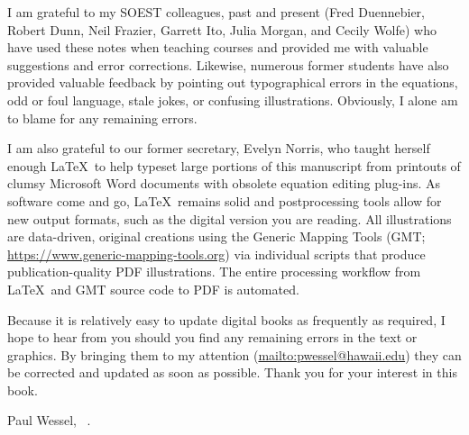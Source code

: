 I am grateful to my SOEST colleagues, past and present (Fred Duennebier, Robert Dunn, Neil Frazier,
Garrett Ito, Julia Morgan, and Cecily Wolfe) who have used these notes when teaching
courses and provided me with valuable suggestions and error corrections.  Likewise, numerous former students have
also provided valuable feedback by pointing out typographical errors in the equations, odd or foul language,
stale jokes, or confusing illustrations.  Obviously, I alone am to blame for any remaining errors.

I am also grateful to our former secretary, Evelyn Norris,
who taught herself enough \LaTeX\ to help typeset large portions of this manuscript from printouts of clumsy Microsoft Word documents
with obsolete equation editing plug-ins.  As software come and go, \LaTeX\ remains solid and postprocessing tools allow
for new output formats, such as the digital version you are reading.  All illustrations are data-driven, original creations using the
Generic Mapping Tools (GMT; \url{https://www.generic-mapping-tools.org}) via individual scripts that produce
publication-quality PDF illustrations.  The entire processing workflow from \LaTeX\ and GMT source code to PDF is automated.

Because it is relatively easy to update digital books as frequently as required, I hope to hear from you should you find any remaining errors
in the text or graphics.  By bringing them to my attention (\url{mailto:pwessel@hawaii.edu})
they can be corrected and updated as soon as possible.  Thank you for your interest in this book.

\vspace{2\baselineskip}
Paul Wessel, \DAmonth\ \DAyear.
